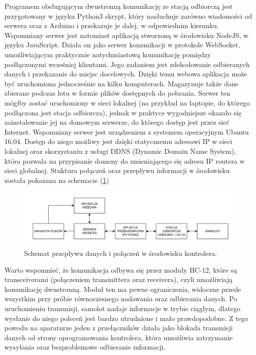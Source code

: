 \documentclass[12pt, a4paper]{article}
\let\oldref\ref
\renewcommand{\ref}[1]{(\oldref{#1})}
\begin{document}
Programem obsługującym dwustronną komunikację ze stacją odbiorczą jest przygotowany w języku Python3 skrypt, który nasłuchuje zarówno wiadomości od serwera oraz z Arduino i przekazuje je dalej, w odpowiednim kierunku. Wspomniany serwer jest natomiast aplikacją stworzoną w środowisku NodeJS, w języku JavaScript. Działa on jako serwer komunikacji w protokole WebSocket, umożliwiającym praktycznie natychmiastową komunikację pomiędzy podłączonymi wcześniej klientami. Jego zadaniem jest zdekodowanie odbieranych danych i przekazanie do miejsc docelowych. Dzięki temu webowa aplikacja może być uruchomiona jednocześnie na kilku komputerach. Magazynuje także dane zbierane podczas lotu w formie plików dostępnych do pobrania. Serwer ten mógłby zostać uruchomiony w sieci lokalnej (na przykład na laptopie, do którego podłączona jest stacja odbiorcza), jednak w praktyce wygodniejsze okazało się zainstalowanie jej na domowym serwerze, do którego dostęp jest przez sieć Internet. Wspomniany serwer jest urządzeniem z systemem operacyjnym Ubuntu 16.04. Dostęp do niego możliwy jest dzięki statycznemu adresowi IP w sieci lokalnej oraz skorzystaniu z usługi DDNS (Dynamic Domain Name System), która pozwala na przypisanie domeny do zmieniającego się adresu IP routera w sieci globalnej. Stuktura połączeń oraz przepływu informacji w środowisku została pokazana na schemacie \ref{fig:env}

 \begin{figure}[ht]
    \centering
    \includegraphics[width=1\textwidth]{diagram_env}
    \caption{Schemat przepływu danych i połączeń w środowisku kontrolera.}
    \label{fig:env}
\end{figure}

Warto wspomnieć, że komunikacja odbywa się przez moduły HC-12, które są transceiverami (połączeniem transmittera oraz receivera), czyli umożliwiają komunikację dwustronną. Moduł ten ma pewne ograniczenia, widoczne przede wszystkim przy próbie równoczesnego nadawania oraz odbierania danych. Po uruchomieniu transmisji, samolot nadaje informacje w trybie ciągłym, dlatego wysłanie do niego poleceń jest bardzo utrudnione i mało prawdopodobne. Z tego powodu na aparaturze jeden z przełączników działa jako blokada transmisji danych od strony oprogramowania kontrolera, która umożliwia zatrzymanie wysyłania oraz bezproblemowe odbieranie informacji.
\end{document}
